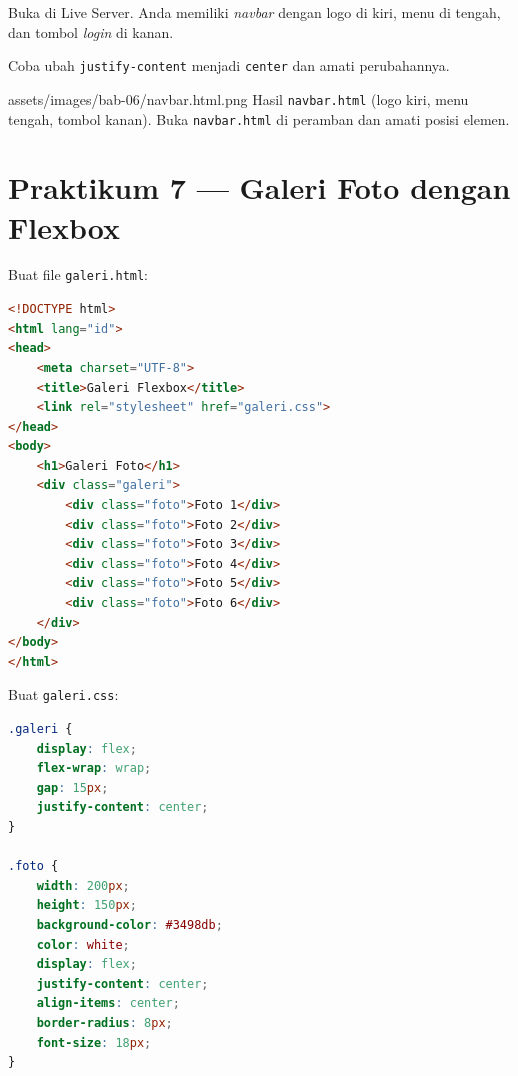 \begin{langkah}
  \item Buka di Live Server. Anda memiliki \emph{navbar} dengan logo di kiri, menu di tengah, dan tombol \emph{login} di kanan.
  \item Coba ubah \texttt{justify-content} menjadi \texttt{center} dan amati perubahannya.
\end{langkah}

\begin{tangkapanlayar}
  {assets/images/bab-06/navbar.html.png}
  {Hasil \texttt{navbar.html} (logo kiri, menu tengah, tombol kanan).}
  {Buka \texttt{navbar.html} di peramban dan amati posisi elemen.}
\end{tangkapanlayar}

\section{Praktikum 7 --- Galeri Foto dengan Flexbox}
\label{sec:flex-praktik-galeri}

\begin{langkah}
  \item Buat file \texttt{galeri.html}:
\end{langkah}

\begin{lstlisting}[language=HTML, caption={Struktur galeri.html}, label={lst:galeri-html}]
<!DOCTYPE html>
<html lang="id">
<head>
    <meta charset="UTF-8">
    <title>Galeri Flexbox</title>
    <link rel="stylesheet" href="galeri.css">
</head>
<body>
    <h1>Galeri Foto</h1>
    <div class="galeri">
        <div class="foto">Foto 1</div>
        <div class="foto">Foto 2</div>
        <div class="foto">Foto 3</div>
        <div class="foto">Foto 4</div>
        <div class="foto">Foto 5</div>
        <div class="foto">Foto 6</div>
    </div>
</body>
</html>
\end{lstlisting}

\begin{langkah}
  \item Buat \texttt{galeri.css}:
\end{langkah}

\begin{lstlisting}[language=CSS, caption={Gaya galeri dengan flexbox}, label={lst:galeri-css}]
.galeri {
    display: flex;
    flex-wrap: wrap;
    gap: 15px;
    justify-content: center;
}

.foto {
    width: 200px;
    height: 150px;
    background-color: #3498db;
    color: white;
    display: flex;
    justify-content: center;
    align-items: center;
    border-radius: 8px;
    font-size: 18px;
}
\end{lstlisting}

